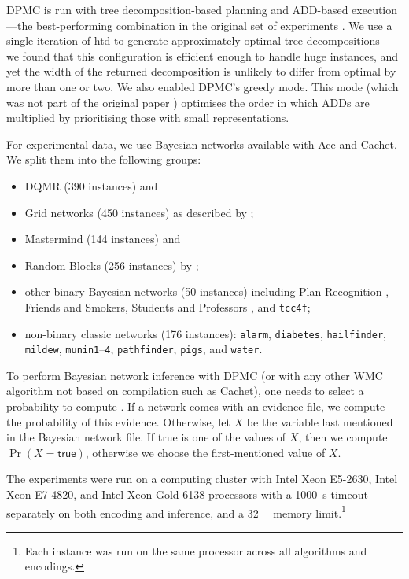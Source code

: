 \textsf{DPMC} is run with tree decomposition-based planning and ADD-based
execution---the best-performing combination in the original set of experiments
\citep{DBLP:conf/cp/DudekPV20}. We use a single iteration of \textsf{htd}
\citep{DBLP:conf/cpaior/AbseherMW17} to generate approximately optimal tree
decompositions---we found that this configuration is efficient enough to handle
huge instances, and yet the width of the returned decomposition is unlikely to
differ from optimal by more than one or two. We also enabled \textsf{DPMC}'s
greedy mode. This mode (which was not part of the original paper
\citep{DBLP:conf/cp/DudekPV20}) optimises the order in which ADDs are multiplied
by prioritising those with small representations.

For experimental data, we use Bayesian networks available with \textsf{Ace} and
\textsf{Cachet}. We split them into the following groups:
\begin{itemize}
\item DQMR (390 instances) and
\item Grid networks (450 instances) as described by \citet{DBLP:conf/aaai/SangBK05};
\item Mastermind (144 instances) and
\item Random Blocks (256 instances) by \citet{DBLP:journals/ijar/ChaviraDJ06};
\item other binary Bayesian networks (50 instances) including Plan Recognition
  \citep{DBLP:conf/aaai/SangBK05}, Friends and Smokers, Students and Professors
  \citep{DBLP:journals/ijar/ChaviraDJ06}, and \texttt{tcc4f};
\item non-binary classic networks (176 instances): \texttt{alarm},
  \texttt{diabetes}, \texttt{hailfinder}, \texttt{mildew},
  \texttt{munin1}--\texttt{4}, \texttt{pathfinder}, \texttt{pigs}, and
  \texttt{water}.
\end{itemize}

To perform Bayesian network inference with \textsf{DPMC} (or with any
other WMC algorithm not based on compilation such as \textsf{Cachet}), one
needs to select a probability to compute
\citep{DBLP:conf/cp/DudekPV20,DBLP:conf/sat/SangBBKP04}. If a network comes
with an evidence file, we compute the probability of this evidence. Otherwise,
let $X$ be the variable last mentioned in the Bayesian network file. If
\textsf{true} is one of the values of $X$, then we compute $\Pr(X =
\textsf{true})$, otherwise we choose the first-mentioned value of $X$.

The experiments were run on a computing cluster with Intel Xeon E5-2630,
Intel Xeon E7-4820, and Intel Xeon Gold 6138 processors with a
\SI{1000}{\second} timeout separately on both encoding and inference, and a
\SI{32}{\gibi\byte} memory limit.\footnote{Each instance was run on the same
  processor across all algorithms and encodings.}


